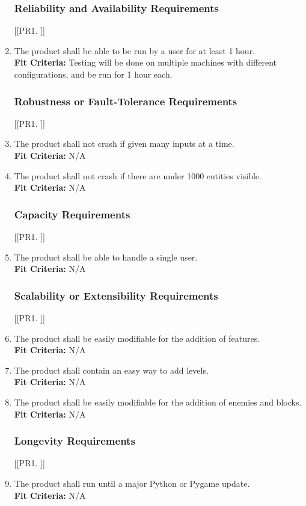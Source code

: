 \documentclass[12pt, titlepage]{article}
\begin{document}
\begin{enumerate}[{PR}1. ]
\subsubsection{Reliability and Availability Requirements}
[{[{PR}1. ]}]
    \item The product shall be able to be run by a user for at least 1 hour.\\
    \textbf{Fit Criteria:} Testing will be done on multiple machines with different configurations, and be run for 1 hour each.

\subsubsection{Robustness or Fault-Tolerance Requirements}
[{[{PR}1. ]}]
    \item The product shall not crash if given many inputs at a time.\\
    \textbf{Fit Criteria:} N/A
    \item The product shall not crash if there are under 1000 entities visible.\\
    \textbf{Fit Criteria:} N/A

\subsubsection{Capacity Requirements}
[{[{PR}1. ]}]
    \item The product shall be able to handle a single user.\\
    \textbf{Fit Criteria:} N/A

\subsubsection{Scalability or Extensibility Requirements}
[{[{PR}1. ]}]
    \item The product shall be easily modifiable for the addition of features.\\
    \textbf{Fit Criteria:} N/A
    \item The product shall contain an easy way to add levels.\\
    \textbf{Fit Criteria:} N/A
    \item The product shall be easily modifiable for the addition of enemies and blocks.\\
    \textbf{Fit Criteria:} N/A

\subsubsection{Longevity Requirements}
[{[{PR}1. ]}]
    \item The product shall run until a major Python or Pygame update.\\
    \textbf{Fit Criteria:} N/A
\end{enumerate}
\end{document}
